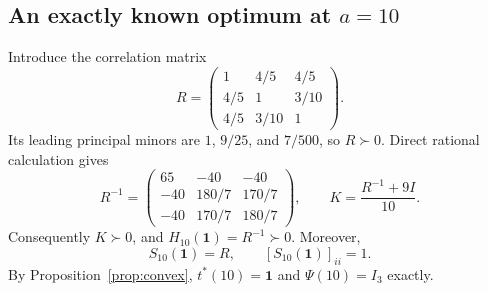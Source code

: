 \documentclass[11pt]{article}
\theoremstyle{remark}\newtheorem{remark}[theorem]{Remark}
\newcommand{\one}{\mathbf 1}
\begin{document}
\subsection{An exactly known optimum at \texorpdfstring{$a=10$}{a=10}}
Introduce the correlation matrix
\begin{equation}\label{eq:R}
R=\begin{pmatrix}
1&4/5&4/5\\
4/5&1&3/10\\
4/5&3/10&1
\end{pmatrix}.
\end{equation}
Its leading principal minors are $1$, $9/25$, and $7/500$, so $R\succ0$. Direct rational calculation gives
\begin{equation}\label{eq:Rinv}
R^{-1}=\begin{pmatrix}
65&-40&-40\\
-40&180/7&170/7\\
-40&170/7&180/7
\end{pmatrix},\qquad K=\frac{R^{-1}+9I}{10}.
\end{equation}
Consequently $K\succ0$, and $H_{10}(\one)=R^{-1}\succ0$. Moreover,
\[
S_{10}(\one)=R,\qquad [S_{10}(\one)]_{ii}=1.
\]
By Proposition~\ref{prop:convex}, $t^*(10)=\one$ and $\Psi(10)=I_3$ exactly.
\end{document}
